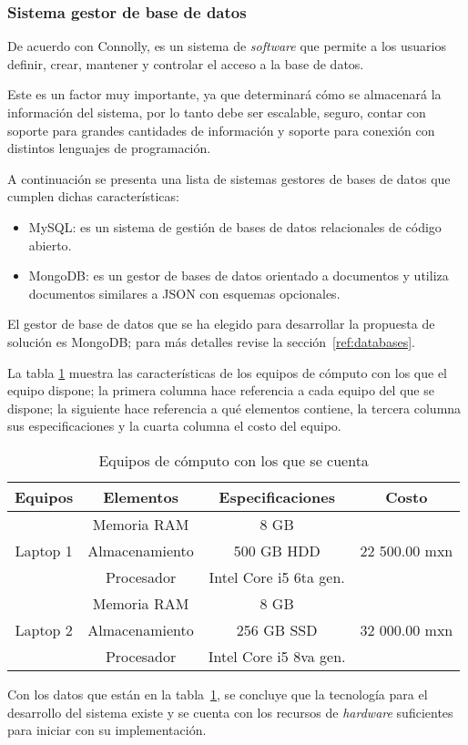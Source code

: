 \subsubsection*{Sistema gestor de base de datos}

De acuerdo con Connolly\cite{connolly_database_2005}, es un sistema de \textit{software} que permite a los usuarios definir, crear, mantener y controlar el acceso a la base de datos.


Este es un factor muy importante, ya que determinará cómo se almacenará la información del sistema, por lo tanto debe ser escalable, seguro, contar con soporte para grandes cantidades de información y soporte para conexión con distintos lenguajes de programación.


A continuación se presenta una lista de sistemas gestores de bases de datos que cumplen dichas características:

\begin{itemize}
    \item MySQL: es un sistema de gestión de bases de datos relacionales de código abierto\cite{dubois_mysql_1999}.
    \item MongoDB: es un gestor de bases de datos orientado a documentos y utiliza documentos similares a JSON con esquemas opcionales\cite{banker_mongodb_2011}.
\end{itemize}

El gestor de base de datos que se ha elegido para desarrollar la propuesta de solución es MongoDB; para más detalles revise la sección~\ref{ref:databases}.


La tabla \ref{tab:hw_devices} muestra las características de los equipos de cómputo con los que el equipo dispone; la primera columna hace referencia a cada equipo del que se dispone; la siguiente hace referencia a qué elementos contiene, la tercera columna sus especificaciones y la cuarta columna el costo del equipo.

\begin{table}[H]
    \centering
    \begin{tabular}{|c|c|c|c|}
        \hline
        Equipos & Elementos & Especificaciones & Costo \\ \hline
        \multirow{3}{*}{Laptop 1} & Memoria RAM & 8 GB & \\
        & Almacenamiento & 500 GB HDD & 22 500.00 mxn  \\
        & Procesador & Intel Core i5 6ta gen. & \\ \hline
        \multirow{3}{*}{Laptop 2} & Memoria RAM & 8 GB & \\
        & Almacenamiento & 256 GB SSD & 32 000.00 mxn \\
        & Procesador & Intel Core i5 8va gen. & \\ \hline
    \end{tabular}
    \caption{Equipos de cómputo con los que se cuenta}
    \label{tab:hw_devices}
\end{table}


Con los datos que están en la tabla~\ref{tab:hw_devices}, se concluye que la tecnología para el desarrollo del sistema existe y se cuenta con los recursos de \textit{hardware} suficientes para iniciar con su implementación.